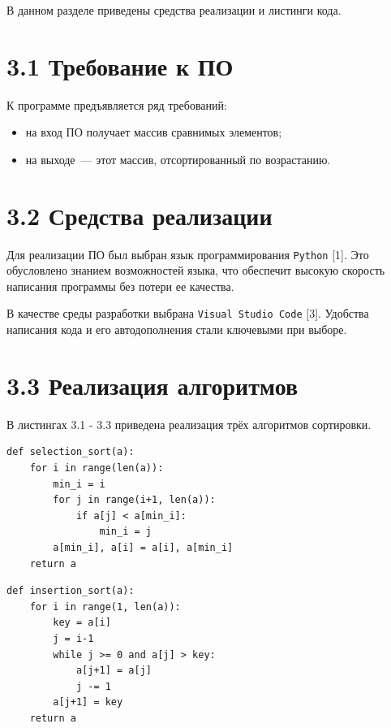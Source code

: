 \documentclass[12pt, a4paper]{report}
\begin{document}
В данном разделе приведены средства реализации и листинги кода.

\section*{3.1 Требование к ПО}

К программе предъявляется ряд требований:

\begin{itemize}
	\item на вход ПО получает массив сравнимых элементов;
	\item на выходе~--- этот массив, отсортированный по возрастанию.
\end{itemize}

\section*{3.2 Средства реализации}

Для реализации ПО был выбран язык программирования \verb|Python| [1]. Это обусловлено знанием возможностей языка, что обеспечит высокую скорость написания программы без потери ее качества. 

В качестве среды разработки выбрана \verb|Visual Studio Code| [3]. Удобства написания кода и его автодополнения стали ключевыми при выборе.

\section*{3.3 Реализация алгоритмов}

В листингах 3.1 - 3.3 приведена реализация трёх алгоритмов сортировки.

\begin{lstlisting}[title=Листинг 3.1~--- Сортировка выбором]
def selection_sort(a):
    for i in range(len(a)):
        min_i = i
        for j in range(i+1, len(a)):
            if a[j] < a[min_i]:
                min_i = j
        a[min_i], a[i] = a[i], a[min_i]
    return a
\end{lstlisting}

\begin{lstlisting}[title=Листинг 3.2~--- Сортировка вставками]
def insertion_sort(a):
    for i in range(1, len(a)):
        key = a[i]
        j = i-1
        while j >= 0 and a[j] > key:
            a[j+1] = a[j]
            j -= 1
        a[j+1] = key
    return a
\end{lstlisting}
\end{document}
